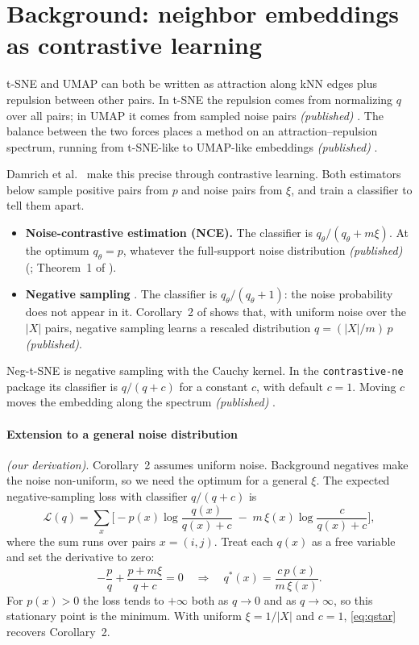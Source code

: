 \documentclass[10pt]{article}
\newcommand{\cpub}{\textit{\small (published)}}
\newcommand{\cder}{\textit{\small (our derivation)}}
\begin{document}
\section{Background: neighbor embeddings as contrastive learning}
\label{sec:background}

t-SNE \cite{vandermaaten2008tsne} and UMAP \cite{mcinnes2018umap} can both be written as attraction along kNN edges plus repulsion between other pairs. In t-SNE the repulsion comes from normalizing $q$ over all pairs; in UMAP it comes from sampled noise pairs \cpub{} \cite{damrich2023tsne}. The balance between the two forces places a method on an attraction--repulsion spectrum, running from t-SNE-like to UMAP-like embeddings \cpub{} \cite{bohm2022spectrum}.

Damrich et al.\ \cite{damrich2023tsne} make this precise through contrastive learning. Both estimators below sample positive pairs from $p$ and noise pairs from $\xi$, and train a classifier to tell them apart.
\begin{itemize}
  \item \textbf{Noise-contrastive estimation (NCE).} The classifier is $q_\theta/(q_\theta + m\xi)$. At the optimum $q_\theta = p$, whatever the full-support noise distribution \cpub{} (\cite{gutmann2010nce}; Theorem~1 of \cite{damrich2023tsne}).
  \item \textbf{Negative sampling} \cite{mikolov2013word2vec,levy2014neural}. The classifier is $q_\theta/(q_\theta + 1)$: the noise probability does not appear in it. Corollary~2 of \cite{damrich2023tsne} shows that, with uniform noise over the $|X|$ pairs, negative sampling learns a rescaled distribution $q = (|X|/m)\,p$ \cpub.
\end{itemize}
Neg-t-SNE is negative sampling with the Cauchy kernel. In the \texttt{contrastive-ne} package its classifier is $q/(q+c)$ for a constant $c$, with default $c = 1$. Moving $c$ moves the embedding along the spectrum \cpub{} \cite{damrich2023tsne}.

\paragraph{Extension to a general noise distribution} \cder. Corollary~2 assumes uniform noise. Background negatives make the noise non-uniform, so we need the optimum for a general $\xi$. The expected negative-sampling loss with classifier $q/(q+c)$ is
\begin{equation}
  \mathcal{L}(q) = \sum_{x} \Big[ -p(x)\log\frac{q(x)}{q(x)+c} \;-\; m\,\xi(x)\log\frac{c}{q(x)+c} \Big],
\end{equation}
where the sum runs over pairs $x = (i,j)$. Treat each $q(x)$ as a free variable and set the derivative to zero:
\begin{equation}
  -\frac{p}{q} + \frac{p + m\xi}{q + c} = 0
  \quad\Longrightarrow\quad
  q^*(x) = \frac{c\,p(x)}{m\,\xi(x)} .
  \label{eq:qstar}
\end{equation}
For $p(x) > 0$ the loss tends to $+\infty$ both as $q \to 0$ and as $q \to \infty$, so this stationary point is the minimum. With uniform $\xi = 1/|X|$ and $c = 1$, \cref{eq:qstar} recovers Corollary~2.
\end{document}
